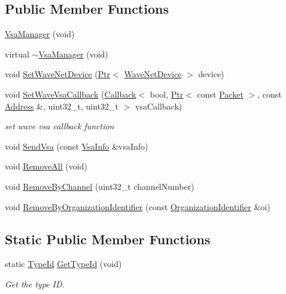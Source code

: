 \subsection*{Public Member Functions}
\begin{DoxyCompactItemize}
\item 
\hyperlink{classns3_1_1VsaManager_a283a4c9945639bb4fe32133024ee52bc}{Vsa\+Manager} (void)
\item 
virtual \hyperlink{classns3_1_1VsaManager_adb3a9a1ecbab2d9e4ac9ef318ce179a6}{$\sim$\+Vsa\+Manager} (void)
\item 
void \hyperlink{classns3_1_1VsaManager_a73647933b1d7efe2fd5c50d313aa11db}{Set\+Wave\+Net\+Device} (\hyperlink{classns3_1_1Ptr}{Ptr}$<$ \hyperlink{classns3_1_1WaveNetDevice}{Wave\+Net\+Device} $>$ device)
\item 
void \hyperlink{classns3_1_1VsaManager_a1d51c2011ec5e0ee0d3ea812b0ccd189}{Set\+Wave\+Vsa\+Callback} (\hyperlink{classns3_1_1Callback}{Callback}$<$ bool, \hyperlink{classns3_1_1Ptr}{Ptr}$<$ const \hyperlink{classns3_1_1Packet}{Packet} $>$, const \hyperlink{classns3_1_1Address}{Address} \&, uint32\+\_\+t, uint32\+\_\+t $>$ vsa\+Callback)
\begin{DoxyCompactList}\small\item\em set wave vsa callback function \end{DoxyCompactList}\item 
void \hyperlink{classns3_1_1VsaManager_af896634c89ed0725215aa5da43445295}{Send\+Vsa} (const \hyperlink{structns3_1_1VsaInfo}{Vsa\+Info} \&vsa\+Info)
\item 
void \hyperlink{classns3_1_1VsaManager_ac27455a3d1a998d8ddd69029cd9a73cf}{Remove\+All} (void)
\item 
void \hyperlink{classns3_1_1VsaManager_ad526912b634fd876c98b6d2695bea1e9}{Remove\+By\+Channel} (uint32\+\_\+t channel\+Number)
\item 
void \hyperlink{classns3_1_1VsaManager_ae158c6a30d3d971b6dae5ac58263dffa}{Remove\+By\+Organization\+Identifier} (const \hyperlink{classns3_1_1OrganizationIdentifier}{Organization\+Identifier} \&oi)
\end{DoxyCompactItemize}
\subsection*{Static Public Member Functions}
\begin{DoxyCompactItemize}
\item 
static \hyperlink{classns3_1_1TypeId}{Type\+Id} \hyperlink{classns3_1_1VsaManager_a9a6cfa45b3cf63f019a2eb868dcf365d}{Get\+Type\+Id} (void)
\begin{DoxyCompactList}\small\item\em Get the type ID. \end{DoxyCompactList}\end{DoxyCompactItemize}
